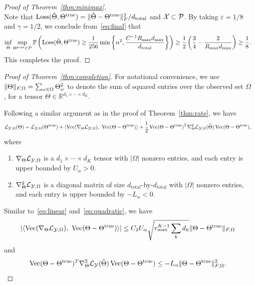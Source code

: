 \documentclass[11pt]{article}
\theoremstyle{plain}
\theoremstyle{definition}
\begin{document}
\begin{proof}[Proof of Theorem~\ref{thm:minimax}]
\begin{equation}
\end{equation}
Note that $\text{Loss}(\hat \Theta, \Theta^{\text{true}})=\lVert\hat \Theta- \Theta^{\text{true}}\rVert_F^2/d_{\text{total}}$ and $\mathcal{X}\subset \mathcal{P}$. By taking $\varepsilon=1/8$ and $\gamma=1/2$, we conclude from~\eqref{eq:final} that
\begin{equation*}\label{eq:prob}
\inf_{\hat \Theta}\sup_{\Theta^{\text{true}}\in \mathcal{P}}\mathbb{P}\left(\text{Loss}(\hat \Theta, \Theta^{\text{true}})\geq {1 \over 256}\min\left \{ \alpha^2,  {C^{-1}R_{\max}d_{\max}\over d_{\text{total}}}\right \}\right)\geq {1\over 2}\left({3\over 4}- {2\over R_{\max}d_{\max}} \right)\geq {1\over 8}.
\end{equation*}
This completes the proof.
\end{proof}


\begin{proof}[Proof of Theorem~\ref{thm:completion}]

For notational convenience, we use $\lVert\Theta\rVert_{F,\Omega}=\sum_{\omega\in\Omega}\Theta^2_\omega$ to denote the sum of squared entries over the observed set $\Omega$, for a tensor $\Theta\in\mathbb{R}^{d_1\times \cdots \times d_K}$.

Following a similar argument as in the proof of Theorem~\ref{thm:rate}, we have
\begin{equation}\label{eq:Taylor2}
\logl(\Theta)=\logl(\trueT)+\langle\Vec(\plogl),\ \Vec(\Theta-\trueT)\rangle+{1\over 2}\Vec(\Theta-\trueT)^T\pplogl(\check\Theta)\Vec(\Theta-\trueT),
\end{equation}
where
\begin{enumerate}
\item $\nabla_{\Theta}\mathcal{L}_{\mathcal{Y},\Omega}$ is a $d_1\times\cdots\times d_K$ tensor with $|\Omega|$ nonzero entries, and each entry is upper bounded by $U_\alpha>0$.
\item $\nabla^2_{\Theta}\mathcal{L}_{\mathcal{Y},\Omega}$ is a diagonal matrix of size $d_{\text{total}}$-by-$d_{\text{total}}$ with $|\Omega|$ nonzero entries, and each entry is upper bounded by $-L_{\alpha}<0$.
\end{enumerate}

Similar to~\eqref{eq:linear} and~\eqref{eq:quadratic}, we have
\begin{equation}\label{eq:linear2}
|\langle\operatorname{Vec}(\nabla_{\Theta}\mathcal{L}_{\mathcal{Y},\Omega}),\ \operatorname{Vec}(\Theta-\Theta^{\text{true}})\rangle|\leq C_2U_\alpha \sqrt{r_{\max}^{K-1}\sum_k d_k}\lVert\Theta-\Theta^{\text{true}}\rVert_{F,\Omega}
\end{equation}
and
\begin{equation}\label{eq:quadratic2}
\operatorname{Vec}(\Theta-\Theta^{\text{true}})^T\nabla^2_{\Theta}\mathcal{L}_{\mathcal{Y}}(\check\Theta)\operatorname{Vec}(\Theta-\Theta^{\text{true}})\leq -L_\alpha \lVert\Theta-\Theta^{\text{true}}\rVert_{F,\Omega}^2.
\end{equation}


\end{proof}
\end{document}
